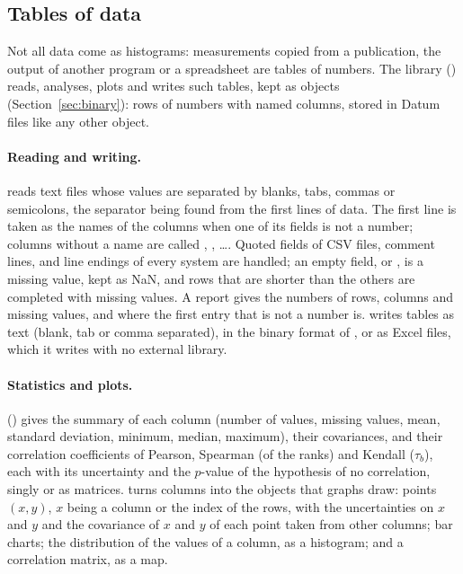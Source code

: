 \subsection{Tables of data}
\label{sec:tables}

Not all data come as histograms: measurements copied from a publication, the output of another program or a
spreadsheet are tables of numbers. The  library () reads, analyses,
plots and writes such tables, kept as  objects (Section~\ref{sec:binary}): rows of numbers with named
columns, stored in Datum files like any other object.

\paragraph{Reading and writing.}
 reads text files whose values are separated by blanks, tabs, commas or semicolons, the separator
being found from the first lines of data. The first line is taken as the names of the columns when one of its fields
is not a number; columns without a name are called , , \ldots. Quoted fields of CSV files, comment
lines, and line endings of every system are handled; an empty field, or , is a missing value, kept as NaN,
and rows that are shorter than the others are completed with missing values. A report gives the numbers of rows,
columns and missing values, and where the first entry that is not a number is.  writes tables as
text (blank, tab or comma separated), in the binary format of \Datum{}, or as Excel files, which it writes with no
external library.

\paragraph{Statistics and plots.}
 () gives the summary of each column (number of values, missing
values, mean, standard deviation, minimum, median, maximum), their covariances, and their correlation coefficients
of Pearson, Spearman (of the ranks) and Kendall ($\tau_b$), each with its uncertainty and the $p$-value of the
hypothesis of no correlation, singly or as matrices.  turns columns into the objects that graphs
draw: points $(x, y)$, $x$ being a column or the index of the rows, with the uncertainties on $x$ and $y$ and the
covariance of $x$ and $y$ of each point taken from other columns; bar charts; the distribution of the values of a
column, as a histogram; and a correlation matrix, as a map.

